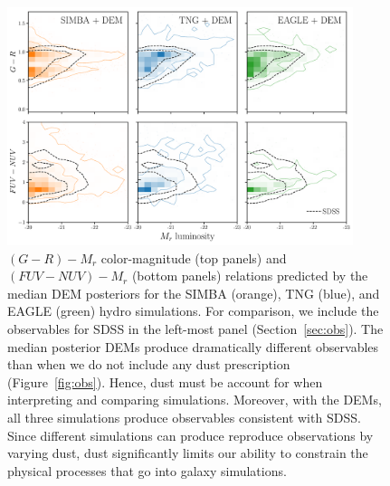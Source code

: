 \begin{figure}
\begin{center}
    \includegraphics[width=0.9\textwidth]{figs/abc_observables.pdf}
    \caption{\label{fig:dem}
    $(G-R) - M_r$ color-magnitude (top panels) and $(FUV-NUV) - M_r$ (bottom
    panels) relations predicted by the median DEM posteriors for the SIMBA
    (orange), TNG (blue), and EAGLE (green) hydro simulations. For comparison, 
    we include the observables for SDSS in the left-most panel
    (Section~\ref{sec:obs}). The median posterior DEMs produce dramatically 
    different observables than when we do not include any dust prescription
    (Figure~\ref{fig:obs}). Hence, dust must be account for when interpreting 
    and comparing simulations. Moreover, with the DEMs, all three simulations
    produce observables consistent with SDSS. Since different simulations can 
    produce reproduce observations by varying dust, dust significantly limits
    our ability to constrain the physical processes that go into galaxy
    simulations. 
    }
\end{center}
\end{figure}


